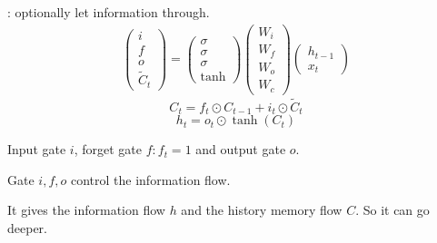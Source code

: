 : optionally let information through.
\begin{align*}
    \begin{pmatrix}
        i\\
        f\\
        o\\
        \tilde{C}_t
    \end{pmatrix}=\begin{pmatrix}
        \sigma\\
        \sigma\\
        \sigma\\
        \tanh
    \end{pmatrix}\begin{pmatrix}
        W_i\\
        W_f\\
        W_o\\
        W_c
    \end{pmatrix}\begin{pmatrix}
        h_{t-1}\\
        x_t
    \end{pmatrix}
\end{align*}
\[C_t=f_t\odot C_{t-1}+i_t\odot \tilde{C}_t\]
\[h_t=o_t\odot \tanh(C_t)\]

Input gate  $ i $, forget gate  $ f:f_t=1 $ and output gate  $ o $. 

Gate  $ i,f,o $ control the information flow.

It gives the information flow  $ h $ and the history memory flow  $ C $. So it can go deeper.

